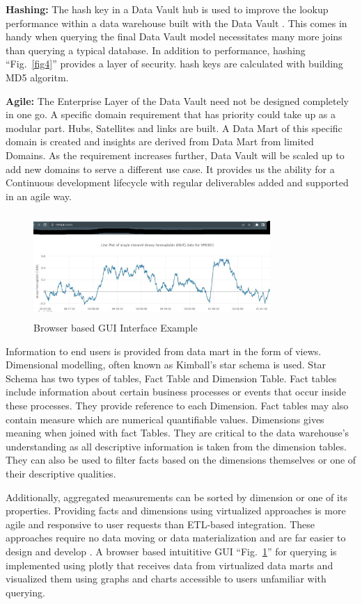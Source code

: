 \documentclass[conference]{IEEEtran}
\begin{document}
\smallskip
\noindent
\textbf{Hashing:} The hash key in a Data Vault hub is used to improve the lookup performance within a data warehouse built with the Data Vault \cite{b4}. This comes in handy when querying the final Data Vault model necessitates many more joins than querying a typical database. In addition to performance, hashing ``Fig.~\ref{fig4}'' provides a layer of security. hash keys are calculated with building MD5 algoritm.

\smallskip
\noindent
\textbf{Agile:} The Enterprise Layer of the Data Vault need not be designed completely in one go. A specific domain requirement that has priority could take up as a modular part. Hubs, Satellites and links are built. A Data Mart of this specific domain is created and insights are derived from Data Mart from limited Domains. As the requirement increases further, Data Vault will be scaled up to add new domains to serve a different use case. It provides us the ability for a Continuous development lifecycle with regular deliverables added and supported in an agile way.

\begin{figure}[htbp]
\centerline{\includegraphics[width=9cm, height=4cm]{Figure5.png}}
\caption{Browser based GUI Interface Example}
\label{fig5}
\end{figure}

Information to end users is provided from data mart in the form of views. Dimensional modelling, often known as Kimball's star schema is used. Star Schema has two types of tables, Fact Table and Dimension Table. Fact tables include information about certain business processes or events that occur inside these processes. They provide reference to each Dimension. Fact tables may also contain measure which are numerical quantifiable values. Dimensions gives meaning when joined with fact Tables. They are critical to the data warehouse's understanding as all descriptive information is taken from the dimension tables. They can also be used to filter facts based on the dimensions themselves or one of their descriptive qualities. 

Additionally, aggregated measurements can be sorted by dimension or one of its properties. Providing facts and dimensions using virtualized approaches is more agile and responsive to user requests than ETL-based integration. These approaches require no data
moving or data materialization and are far easier to design and develop \cite{b5}. A browser based intuititive GUI ``Fig.~\ref{fig5}'' for querying is implemented using plotly that receives data from virtualized data marts and visualized them using graphs and charts accessible to users unfamiliar with querying.
\end{document}

